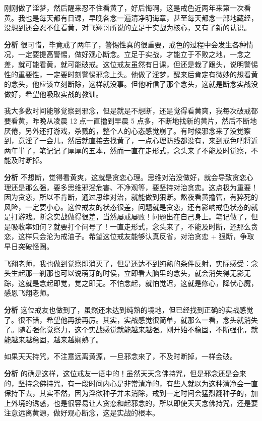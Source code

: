 \begin{case}
    刚刚做了淫梦，然后醒来忍不住看黄了，好后悔啊，这是戒色近两年来第一次看黄。我也是每天都有日课，早晚各念一遍清净明诲章，甚至每天都念一部地藏经，没想到还会忍不住看黄，对飞翔哥所说的立足于实战为核心，又有了新的认识。

    \textbf{分析} 很可惜，毕竟戒了两年了，警惕性真的很重要，戒色的过程中会发生各种情况，一定要提高警惕，做好观心断念。立足于实战，才能立于不败之地，一念之差，就可能看黄，就可能破戒。这位戒友虽然有日课，但还是栽了跟头，说明警惕性的重要性，一定要时刻警惕邪念上头。他做了淫梦，醒来后肯定有微妙的想看黄的念头，他应该立刻断除，这样就没事。但他听信了那个念头，这就是断念实战没做好，希望他吸取实战的教训。
\end{case}

\begin{case}
    我大多数时间能够觉察到邪念，但是就是不想断，还是觉得看黄爽，我每次破戒都要看黄，昨晚从凌晨 12 点一直撸到早晨 5 点多，不断地找新的黄片，然后不断地厌倦，另外还打游戏，杀戮的，整个人的心态感觉崩了。有时候邪念来了没觉察到，意淫了一会儿，然后就直接去找黄了，一点心理防线都没有，来到戒色吧将近两年半了，笔记记了厚厚的五本，然而一直在走形式，念头来了不能及时觉察，不能及时断掉。

    \textbf{分析} 不想断，觉得看黄爽，这就是贪恋心理。思维对治没做好，就会导致贪恋心理还是那么强，要多思维邪淫危害、不净观等，要坚持对治贪恋。这点极为重要！因为贪恋，所以不肯断，通过思维对治，就能做到狠断。熬夜看黄撸管，有猝死的风险，一定要小心。这位戒友的状态很差，问题就是贪恋，还有影响戒色状态的就是打游戏。断念实战做得很差，当然屡戒屡败！问题出在自己身上。笔记做了，但是吸收率如何？就要打个问号了！一直走形式，念头来了，不能及时断，还那么贪恋，这样只会沦为戒油子。希望这位戒友能够认真反省，对治贪恋 + 狠断，争取早日突破怪圈。
\end{case}

\begin{case}
    飞翔老师，我也做到觉察即消灭了，但是还达不到纯熟的条件反射，实际感受：念头生起那一刹那也可以说萌芽的时侯，立即看大脑里的念头，就会消失得无影无踪，这就是念起即觉，觉之即无。不怕念起，就怕觉迟，这就是修心，降伏心魔，感恩飞翔老师。

    \textbf{分析} 这位戒友也做到了，虽然还未达到纯熟的境地，但已经找到正确的实战感觉了。很不错，希望他再接再厉。其实，实战感觉很简单，就那么一看，念头就消失了。随着强化觉察力，这个实战感觉就能越来越强。刚开始不稳固，不断强化，就能越来越稳固，越来越娴熟了。
\end{case}

\begin{case}
    如果天天持咒，不注意远离黄源，一旦邪念來了，不及时断掉，一样会破。

    \textbf{分析} 的确是这样，这位戒友一语中的！虽然天天念佛持咒，但是邪念还是会来的，坚持念佛持咒，有一段时间内心是非常清净的，有些人就以为这种清净会一直保持下去，其实不然，因为淫欲种子并未消除，戒到一定时间会猛烈翻种子的，加上外境的诱惑，也是很容易让人贪恋和起邪念的，所以即使天天念佛持咒，还是要注意远离黄源，做好观心断念，这是实战的根本。
\end{case}

